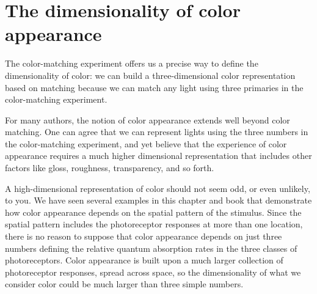 \section{The dimensionality of color appearance}

The color-matching experiment offers us
a precise way to define the dimensionality
of color:  we can build a three-dimensional
color representation based on matching because
we can match any light using three primaries in the
color-matching experiment.

For many authors, the notion of color appearance
extends well beyond color matching.
One can agree that we can represent lights
using the three numbers in the color-matching experiment,
and yet believe that the experience of color appearance
requires a much higher dimensional representation
that includes other factors like gloss, roughness,
transparency, and so forth.

A high-dimensional representation of color
should not seem odd, or even unlikely, to you.
We have seen several examples in this chapter and book
that demonstrate how color appearance depends on the spatial
pattern of the stimulus.
Since the spatial pattern includes the photoreceptor responses
at more than one location, there is no reason to suppose that
color appearance depends on just three numbers defining
the relative quantum absorption
rates in the three classes of photoreceptors.
Color appearance is built upon a much larger collection
of photoreceptor responses, spread across space, so the
dimensionality of what we consider color could be much
larger than three simple numbers.

